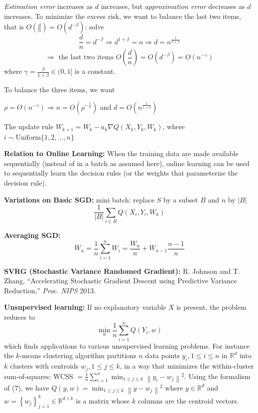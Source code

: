 \documentclass[11pt]{elegantbook}
\begin{document}
\textit{Estimation error} increases as $d$ increases, but \textit{approximation error} decreases as $d$ increases. To minimize the excess risk, we want to balance the last two items, that is $O(\frac{d}{n})=O(d^{-\beta})$: solve $$\frac{d}{n}=d^{-\beta} \Rightarrow d^{1+\beta}=n \Rightarrow d=n^{\frac{1}{1+\beta}}$$
$$\Rightarrow\text{ the last two items } O(\frac{d}{n})=O(d^{-\beta})=O(n^{-\gamma})$$
where $\gamma=\frac{\beta}{1+\beta}\in(0,1]$ is a constant.

To balance the three items, we want
\begin{center}
    $\rho=O(n^{-\gamma})\Rightarrow n=O(\rho^{-\frac{1}{\gamma}})$ and $d=O(n^{\frac{1}{1+\beta}})$
\end{center}

The update rule $W_{k+1}=W_k-a_k \nabla Q(X_k,Y_k,W_k)$, where $i\sim \text{Uniform}\{1,2,...,n\}$

\textbf{Relation to Online Learning:} When the training data are made available sequentially (instead of in a batch as assumed here), online learning can be used to sequentially learn the decision rules (or the weights that parameterize the decision rule).

\textbf{Variations on Basic SGD:} mini batch: replace $S$ by a subset $B$ and $n$ by $|B|$
$$\frac{1}{|B|}\sum_{i\in B}Q(X_i,Y_i,W_k)$$

\textbf{Averaging SGD:} $$\bar{W}_n=\frac{1}{n}\sum_{i=1}^nW_i=\frac{W_n}{n}+\bar{W}_{n-1}\frac{n-1}{n}$$

\textbf{SVRG (Stochastic Variance Randomed Gradient):} R. Johnson and T. Zhang, “Accelerating Stochastic Gradient Descent using Predictive Variance Reduction,” \textit{Proc. NIPS} 2013.

\textbf{Unsupervised learning:} If no explanatory variable $X$ is present, the problem reduces to
$$
\min _w \frac{1}{n} \sum_{i=1}^n Q\left(Y_i, w\right)
$$
which finds applications to various unsupervised learning problems. For instance the $k$-means clustering algorithm partitions $n$ data points $y_i, 1 \leq i \leq n$ in $\mathbb{R}^d$ into $k$ clusters with centroids $w_j, 1 \leq j \leq k$, in a way that minimizes the within-cluster sum-of-squares: WCSS $=\frac{1}{n} \sum_{i=1}^n \min _{1 \leq j \leq k}\left\|y_i-w_j\right\|^2$. Using the formalism of (7), we have $Q(y, w)=\min _{1 \leq j \leq k}\left\|y-w_j\right\|^2$ where $y \in \mathbb{R}^d$ and $w=\left\{w_j\right\}_{j=1}^k \in \mathbb{R}^{d \times k}$ is a matrix whose $k$ columns are the centroid vectors.
\end{document}
